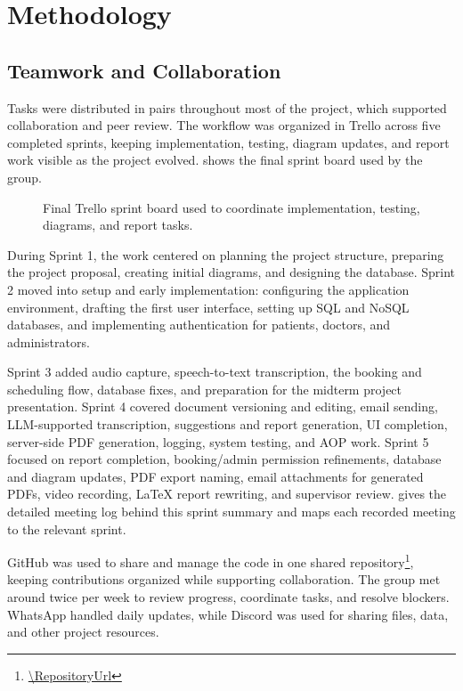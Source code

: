 \section{Methodology}
\label{sec:methodology}

\subsection{Teamwork and Collaboration}
\label{subsec:teamwork-collaboration}

Tasks were distributed in pairs throughout most of the project, which supported collaboration and peer review. The workflow was organized in Trello across five completed sprints, keeping implementation, testing, diagram updates, and report work visible as the project evolved.  shows the final sprint board used by the group.

\begin{figure}[htbp]
\centering
{}
\caption{Final Trello sprint board used to coordinate implementation, testing, diagrams, and report tasks.}
\label{fig:trello-board}
\end{figure}
\FloatBarrier

During Sprint 1, the work centered on planning the project structure, preparing the project proposal, creating initial diagrams, and designing the database. Sprint 2 moved into setup and early implementation: configuring the application environment, drafting the first user interface, setting up SQL and NoSQL databases, and implementing authentication for patients, doctors, and administrators.

Sprint 3 added audio capture, speech-to-text transcription, the booking and scheduling flow, database fixes, and preparation for the midterm project presentation. Sprint 4 covered document versioning and editing, email sending, LLM-supported transcription, suggestions and report generation, UI completion, server-side PDF generation, logging, system testing, and AOP work. Sprint 5 focused on report completion, booking/admin permission refinements, database and diagram updates, PDF export naming, email attachments for generated PDFs, video recording, LaTeX report rewriting, and supervisor review.  gives the detailed meeting log behind this sprint summary and maps each recorded meeting to the relevant sprint.

GitHub was used to share and manage the code in one shared repository\footnote{\url{\RepositoryUrl}}, keeping contributions organized while supporting collaboration. The group met around twice per week to review progress, coordinate tasks, and resolve blockers. WhatsApp handled daily updates, while Discord was used for sharing files, data, and other project resources.

